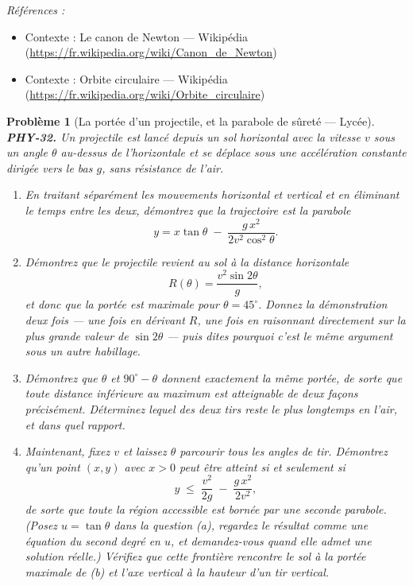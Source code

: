 \documentclass[11pt]{article}
\newtheorem{problem}{Problème}
\newenvironment{refs}{\par\small\noindent\emph{Références :}\begin{itemize}\setlength\itemsep{0pt}}{\end{itemize}\normalsize}
\begin{document}
\begin{refs}
\item Contexte : Le canon de Newton --- Wikipédia (\url{https://fr.wikipedia.org/wiki/Canon_de_Newton})
\item Contexte : Orbite circulaire --- Wikipédia (\url{https://fr.wikipedia.org/wiki/Orbite_circulaire})
\end{refs}

\bigskip

\begin{problem}[{La portée d'un projectile, et la parabole de sûreté --- Lycée}]
\textbf{PHY-32.} Un projectile est lancé depuis un sol horizontal avec la vitesse $ v $ sous
un angle $ \theta $ au-dessus de l'horizontale et se déplace sous une accélération constante
dirigée vers le bas $ g $, sans résistance de l'air.
\begin{enumerate}
\item[(a)] En traitant séparément les mouvements horizontal et vertical et en éliminant le temps entre
les deux, démontrez que la trajectoire est la parabole
\[ y = x\tan\theta \;-\; \frac{g\,x^{2}}{2v^{2}\cos^{2}\theta}. \]
\item[(b)] Démontrez que le projectile revient au sol à la distance horizontale
\[ R(\theta) = \frac{v^{2}\sin 2\theta}{g}, \]
et donc que la portée est maximale pour $ \theta = 45^{\circ} $. Donnez la démonstration
deux fois --- une fois en dérivant $ R $, une fois en raisonnant directement sur la plus grande
valeur de $ \sin 2\theta $ --- puis dites pourquoi c'est le même argument sous un autre
habillage.
\item[(c)] Démontrez que $ \theta $ et $ 90^{\circ} - \theta $ donnent exactement la même portée,
de sorte que toute distance inférieure au maximum est atteignable de deux façons précisément.
Déterminez lequel des deux tirs reste le plus longtemps en l'air, et dans quel rapport.
\item[(d)] Maintenant, fixez $ v $ et laissez $ \theta $ parcourir tous les angles de tir.
Démontrez qu'un point $ (x, y) $ avec $ x > 0 $ peut être atteint si et seulement si
\[ y \;\le\; \frac{v^{2}}{2g} \;-\; \frac{g\,x^{2}}{2v^{2}}, \]
de sorte que toute la région accessible est bornée par une seconde parabole. (Posez
$ u = \tan\theta $ dans la question (a), regardez le résultat comme une équation du second
degré en $ u $, et demandez-vous quand elle admet une solution réelle.) Vérifiez que cette
frontière rencontre le sol à la portée maximale de (b) et l'axe vertical à la hauteur d'un tir
vertical.
\end{enumerate}

\end{problem}
\end{document}
